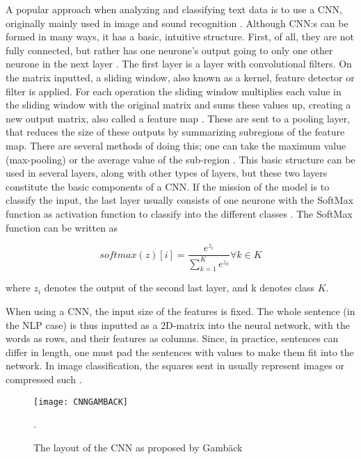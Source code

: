 \documentclass[twocolumn]{article}
\begin{document}
A popular approach when analyzing and classifying text data is to use a CNN, originally mainly used in image and sound recognition \cite{2018HateSD}. Although CNN:s can be formed in many ways, it has a basic, intuitive structure. First, of all, they are not fully connected, but rather has one neurone's output going to only one other neurone in the next layer \cite{wildml}. The first layer is a layer with convolutional filters. On the matrix inputted, a sliding window, also known as a kernel, feature detector or filter is applied. For each operation the sliding window multiplies each value in the sliding window with the original matrix and sums these values up, creating a new output matrix, also called a feature map \cite{wildml}. These are sent to a pooling layer, that reduces the size of these outputs by summarizing subregions of the feature map. There are several methods of doing this; one can take the maximum value (max-pooling) or the average value of the sub-region \cite{dumoulin2016guide}. This basic structure can be used in several layers, along with other types of layers, but these two layers constitute the basic components of a CNN. If the mission of the model is to classify the input, the last layer usually consists of one neurone with the SoftMax function as activation function to classify into the different classes \cite{Lec}. The SoftMax function can be written as 


\begin{equation}
softmax(z)[i] = \frac{e^{z_i}}{\sum_{k=1}^K e^{z_k}} \forall k \in K
\end{equation}

where $z_i$ denotes the output of the second last layer, and k denotes class $K$.

When using a CNN, the input size of the features is fixed. The whole sentence (in the NLP case) is thus inputted as a 2D-matrix into the neural network, with the words as rows, and their features as columns. Since, in practice, sentences can differ in length, one must pad the sentences with values to make them fit into the network. In image classification, the squares sent in usually represent images or compressed such \cite{2018HateSD} . 
\begin{figure}
  \texttt{[image: CNNGAMBACK]}
  \caption{The layout of the CNN as proposed by Gamb\"ack \cite{Gambck2017}}.
  \label{fig:boat1}
\end{figure} 
\end{document}
